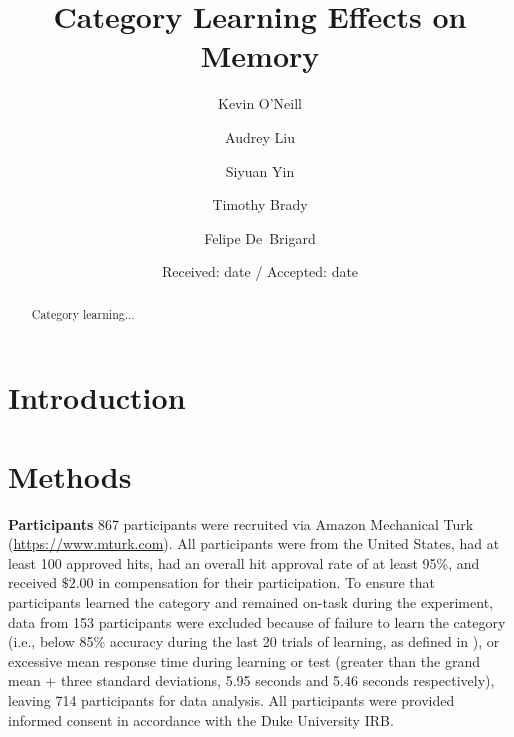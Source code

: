 \documentclass[twocolumn]{svjour3}          %
\begin{document}
\title{Category Learning Effects on Memory
}


\author{Kevin O'Neill \and Audrey Liu \and Siyuan Yin \and Timothy Brady \and Felipe De~Brigard}


\date{Received: date / Accepted: date}


\maketitle

\begin{abstract}
Category learning...
\end{abstract}

\section*{Introduction}
\label{intro}

\section*{Methods}
\label{methods}

\textbf{Participants }
867 participants were recruited via Amazon Mechanical Turk
(\url{https://www.mturk.com}). All participants were from the United
States, had at least 100 approved hits, had an overall hit approval
rate of at least 95\%, and received $\$2.00$ in compensation for their
participation. To ensure that participants learned the category and
remained on-task during the experiment, data from 153 participants
were excluded because of failure to learn the category (i.e., below
85\% accuracy during the last 20 trials of learning, as defined in
\cite{DeBrigard2017}), or excessive mean response time during learning
or test (greater than the grand mean + three standard deviations, 5.95
seconds and 5.46 seconds respectively), leaving 714 participants for
data analysis. All participants were provided informed consent in
accordance with the Duke University IRB.
\end{document}
